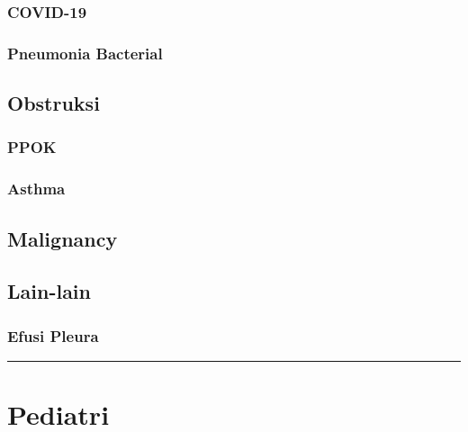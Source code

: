 \documentclass[
]{book}
\begin{document}
\hypertarget{covid-19}{%
\subsubsection{COVID-19}\label{covid-19}}

\hypertarget{pneumonia-bacterial}{%
\subsubsection{Pneumonia Bacterial}\label{pneumonia-bacterial}}

\hypertarget{obstruksi}{%
\subsection{Obstruksi}\label{obstruksi}}

\hypertarget{ppok}{%
\subsubsection{PPOK}\label{ppok}}

\hypertarget{asthma}{%
\subsubsection{Asthma}\label{asthma}}

\hypertarget{malignancy}{%
\subsection{Malignancy}\label{malignancy}}

\hypertarget{lain-lain}{%
\subsection{Lain-lain}\label{lain-lain}}

\hypertarget{efusi-pleura}{%
\subsubsection{Efusi Pleura}\label{efusi-pleura}}

\begin{center}\rule{0.5\linewidth}{0.5pt}\end{center}

\hypertarget{pediatri-1}{%
\section{Pediatri}\label{pediatri-1}}
\end{document}
